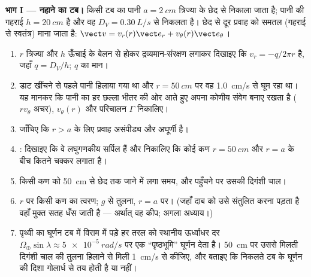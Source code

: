 \begin{problem}
\label{pb:b2:fluid-kinematics:1}

\medskip
\noindent\textbf{भाग I --- नहाने का टब।}
किसी टब का पानी $a = \qty{2}{cm}$ त्रिज्या के छेद से निकाला जाता है; पानी
की गहराई $h = \qty{20}{cm}$ है और वह  $D_V =
\qty{0.30}{L/s}$ से निकलता है। छेद से दूर प्रवाह को समतल
(गहराई से स्वतंत्र) माना जाता है: $\vect v = v_r(r)\vect e_r + v_\theta(r)\vect e_\theta$।
\begin{enumerate}
  \item $r$ त्रिज्या और $h$ ऊँचाई के बेलन से होकर द्रव्यमान-संरक्षण
        लगाकर दिखाइए कि $v_r = -q/2\pi r$ है, जहाँ $q = D_V/h$;
        $q$ का मान।
  \item डाट खींचने से पहले पानी हिलाया गया था और $r = \qty{50}{cm}$ पर
        वह \qty{1.0}{cm/s} से घूम रहा था। यह मानकर कि पानी का हर छल्ला
        भीतर की ओर आते हुए अपना कोणीय संवेग बनाए रखता है
        ($rv_\theta$ अचर), $v_\theta(r)$ और
        परिचालन $\Gamma$ निकालिए।
  \item जाँचिए कि $r > a$ के लिए प्रवाह असंपीड्य और अघूर्णी
        है।
  \item {}: दिखाइए कि वे लघुगणकीय सर्पिल हैं और निकालिए कि
        कोई कण $r = \qty{50}{cm}$ और $r = a$ के बीच
        कितने चक्कर लगाता है।
  \item किसी कण को \qty{50}{cm} से छेद तक जाने में लगा समय, और
        पहुँचने पर उसकी दिगंशी चाल।
  \item $r$ पर किसी कण का त्वरण; $g$ से तुलना, $r = a$ पर।
        (जहाँ दाब को उसे संतुलित करना पड़ता है वहाँ मुक्त सतह धँस जाती है ---
        अर्थात् वह कीप; अगला अध्याय।)
  \item पृथ्वी का घूर्णन टब में विराम में पड़े हर तरल को स्थानीय
        ऊर्ध्वाधर दर $\Omega_\oplus\sin\lambda \approx \qty{5e-5}{rad/s}$ पर एक
        ``पृष्ठभूमि'' घूर्णन देता है। \qty{50}{cm} पर उससे मिलती
        दिगंशी चाल की तुलना हिलाने से मिली \qty{1}{cm/s} से कीजिए, और
        बताइए कि निकलते टब के घूर्णन की दिशा गोलार्ध से तय होती है या नहीं।
\end{enumerate}


\end{problem}
